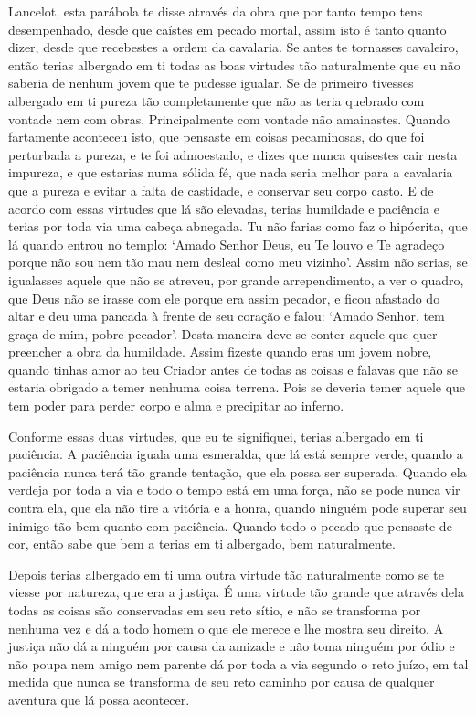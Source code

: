 Lancelot, esta parábola te disse através da obra que por tanto tempo tens
desempenhado, desde que caístes em pecado mortal, assim isto é tanto quanto
dizer, desde que recebestes a ordem da cavalaria. Se antes te tornasses
cavaleiro, então terias albergado em ti todas as boas virtudes tão naturalmente
que eu não saberia de nenhum jovem que te pudesse igualar. Se de primeiro
tivesses albergado em ti pureza tão completamente que não as teria quebrado com
vontade nem com obras. Principalmente com vontade não amainastes. Quando
fartamente aconteceu isto, que pensaste em coisas pecaminosas, do que foi
perturbada a pureza, e te foi admoestado, e dizes que nunca quisestes cair
nesta impureza, e que estarias numa sólida fé, que nada seria melhor para a
cavalaria que a pureza e evitar a falta de castidade, e conservar seu corpo
casto. E de acordo com essas virtudes que lá são elevadas, terias humildade e
paciência e terias por toda via uma cabeça abnegada. Tu não farias como faz o
hipócrita, que lá quando entrou no templo: ‘Amado Senhor Deus, eu Te louvo e Te
agradeço porque não sou nem tão mau nem desleal como meu vizinho’. Assim não
serias, se igualasses aquele que não se atreveu, por grande arrependimento, a
ver o quadro, que Deus não se irasse com ele porque era assim pecador, e ficou
afastado do altar e deu uma pancada à frente de seu coração e falou: ‘Amado
Senhor, tem graça de mim, pobre pecador’. Desta maneira deve-se conter aquele
que quer preencher a obra da humildade. Assim fizeste quando eras um jovem
nobre, quando tinhas amor ao teu Criador antes de todas as coisas e falavas que
não se estaria obrigado a temer nenhuma coisa terrena. Pois se deveria temer
aquele que tem poder para perder corpo e alma e precipitar ao inferno.

Conforme essas duas virtudes, que eu te signifiquei, terias albergado em ti
paciência. A paciência iguala uma esmeralda, que lá está sempre verde, quando a
paciência nunca terá tão grande tentação, que ela possa ser superada. Quando
ela verdeja por toda a via e todo o tempo está em uma força, não se pode nunca
vir contra ela, que ela não tire a vitória e a honra, quando ninguém pode
superar seu inimigo tão bem quanto com paciência. Quando todo o pecado que
pensaste de cor, então sabe que bem a terias em ti albergado, bem naturalmente.

Depois terias albergado em ti uma outra virtude tão naturalmente como se te
viesse por natureza, que era a justiça. É uma virtude tão grande que através
dela todas as coisas são conservadas em seu reto sítio, e não se transforma por
nenhuma vez e dá a todo homem o que ele merece e lhe mostra seu direito. A
justiça não dá a ninguém por causa da amizade e não toma ninguém por ódio e não
poupa nem amigo nem parente dá por toda a via segundo o reto juízo, em tal
medida que nunca se transforma de seu reto caminho por causa de qualquer
aventura que lá possa acontecer.

